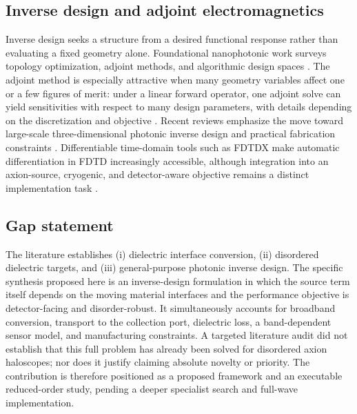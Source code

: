 \documentclass[10.5pt,a4paper]{article}
\begin{document}
\subsection{Inverse design and adjoint electromagnetics}
Inverse design seeks a structure from a desired functional response rather than evaluating a fixed geometry alone. Foundational nanophotonic work surveys topology optimization, adjoint methods, and algorithmic design spaces \parencite{Molesky2018}. The adjoint method is especially attractive when many geometry variables affect one or a few figures of merit: under a linear forward operator, one adjoint solve can yield sensitivities with respect to many design parameters, with details depending on the discretization and objective \parencite{LalauKeraly2013}. Recent reviews emphasize the move toward large-scale three-dimensional photonic inverse design and practical fabrication constraints \parencite{Schul2026}. Differentiable time-domain tools such as FDTDX make automatic differentiation in FDTD increasingly accessible, although integration into an axion-source, cryogenic, and detector-aware objective remains a distinct implementation task \parencite{Mahlau2026}.

\subsection{Gap statement}
The literature establishes (i) dielectric interface conversion, (ii) disordered dielectric targets, and (iii) general-purpose photonic inverse design. The specific synthesis proposed here is an inverse-design formulation in which the source term itself depends on the moving material interfaces and the performance objective is detector-facing and disorder-robust. It simultaneously accounts for broadband conversion, transport to the collection port, dielectric loss, a band-dependent sensor model, and manufacturing constraints. A targeted literature audit did not establish that this full problem has already been solved for disordered axion haloscopes; nor does it justify claiming absolute novelty or priority. The contribution is therefore positioned as a proposed framework and an executable reduced-order study, pending a deeper specialist search and full-wave implementation.
\end{document}
